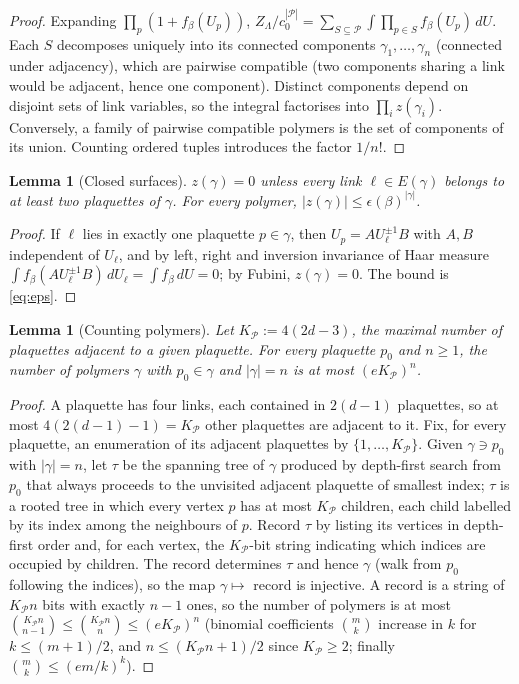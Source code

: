 \documentclass[11pt,a4paper]{article}
\newtheorem{lemma}[theorem]{Lemma}
\theoremstyle{definition}
\theoremstyle{remark}
\newcommand{\cP}{\mathcal{P}}
\newcommand{\dU}{\,dU}
\begin{document}
\begin{proof}
Expanding $\prod_p(1+f_\beta(U_p))$, $Z_\Lambda/c_0^{|\cP|}=\sum_{S\subseteq\cP}\int\prod_{p\in S}f_\beta(U_p)\dU$. Each $S$
decomposes uniquely into its connected components $\gamma_1,\dots,\gamma_n$ (connected under adjacency), which are
pairwise compatible (two components sharing a link would be adjacent, hence one component). Distinct components
depend on disjoint sets of link variables, so the integral factorises into $\prod_iz(\gamma_i)$. Conversely, a family of
pairwise compatible polymers is the set of components of its union. Counting ordered tuples introduces the factor $1/n!$.
\end{proof}

\begin{lemma}[Closed surfaces]\label{lem:closed}
$z(\gamma)=0$ unless every link $\ell\in E(\gamma)$ belongs to at least two plaquettes of $\gamma$. For every polymer,
$|z(\gamma)|\le\epsilon(\beta)^{|\gamma|}$.
\end{lemma}

\begin{proof}
If $\ell$ lies in exactly one plaquette $p\in\gamma$, then $U_p=AU_\ell^{\pm1}B$ with $A,B$ independent of $U_\ell$, and by
left, right and inversion invariance of Haar measure $\int f_\beta(AU_\ell^{\pm1}B)\dU_\ell=\int f_\beta\dU=0$; by Fubini,
$z(\gamma)=0$. The bound is \eqref{eq:eps}.
\end{proof}

\begin{lemma}[Counting polymers]\label{lem:count}
Let $K_\cP:=4(2d-3)$, the maximal number of plaquettes adjacent to a given plaquette. For every plaquette $p_0$ and
$n\ge1$, the number of polymers $\gamma$ with $p_0\in\gamma$ and $|\gamma|=n$ is at most $(eK_\cP)^n$.
\end{lemma}

\begin{proof}
A plaquette has four links, each contained in $2(d-1)$ plaquettes, so at most $4(2(d-1)-1)=K_\cP$ other plaquettes are
adjacent to it. Fix, for every plaquette, an enumeration of its adjacent plaquettes by $\{1,\dots,K_\cP\}$. Given $\gamma\ni p_0$
with $|\gamma|=n$, let $\tau$ be the spanning tree of $\gamma$ produced by depth-first search from $p_0$ that always proceeds
to the unvisited adjacent plaquette of smallest index; $\tau$ is a rooted tree in which every vertex $p$ has at most $K_\cP$
children, each child labelled by its index among the neighbours of $p$. Record $\tau$ by listing its vertices in depth-first
order and, for each vertex, the $K_\cP$-bit string indicating which indices are occupied by children. The record determines
$\tau$ and hence $\gamma$ (walk from $p_0$ following the indices), so the map $\gamma\mapsto$ record is injective. A record is a
string of $K_\cP n$ bits with exactly $n-1$ ones, so the number of polymers is at most
$\binom{K_\cP n}{n-1}\le\binom{K_\cP n}{n}\le(eK_\cP)^n$ (binomial coefficients $\binom mk$ increase in $k$ for
$k\le(m+1)/2$, and $n\le(K_\cP n+1)/2$ since $K_\cP\ge2$; finally $\binom mk\le(em/k)^k$).
\end{proof}
\end{document}
